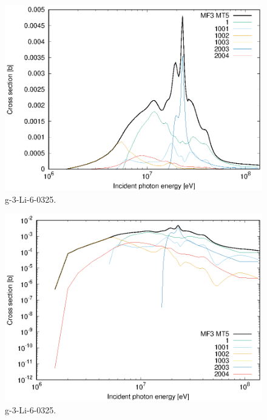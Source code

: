 \begin{figure}
 \includegraphics[width=\linewidth]{eps/g_3-Li-6_0325.eps}
  \caption{g-3-Li-6-0325.}
\end{figure}
\begin{figure}
 \includegraphics[width=\linewidth]{eps-log/g_3-Li-6_0325.eps}
 \caption{g-3-Li-6-0325.}
\end{figure}
\newpage \clearpage

